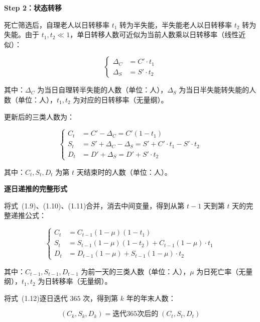 \documentclass[12pt,a4paper]{article}
\begin{document}
\noindent\textbf{Step 2：状态转移}

死亡筛选后，自理老人以日转移率 $t_1$ 转为半失能，半失能老人以日转移率 $t_2$ 转为失能。由于 $t_1, t_2 \ll 1$，单日转移人数可近似为当前人数乘以日转移率（线性近似）：

\begin{equation}
\left\{
\begin{aligned}
\Delta_C &= C' \cdot t_1 \\
\Delta_S &= S' \cdot t_2
\end{aligned}
\right.
\tag{1.10}
\end{equation}

其中：$\Delta_C$ 为当日自理转半失能的人数（单位：人），$\Delta_S$ 为当日半失能转失能的人数（单位：人），$t_1, t_2$ 为对应的日转移率（无量纲）。

更新后的三类人数为：

\begin{equation}
\left\{
\begin{aligned}
C_t &= C' - \Delta_C = C'(1 - t_1) \\
S_t &= S' + \Delta_C - \Delta_S = S' + C' \cdot t_1 - S' \cdot t_2 \\
D_t &= D' + \Delta_S = D' + S' \cdot t_2
\end{aligned}
\right.
\tag{1.11}
\end{equation}

其中：$C_t, S_t, D_t$ 为第 $t$ 天结束时的人数（单位：人）。

\noindent\textbf{逐日递推的完整形式}

将式~(1.9)、(1.10)、(1.11)合并，消去中间变量，得到从第 $t-1$ 天到第 $t$ 天的完整递推公式：

\begin{equation}
\boxed{
\left\{
\begin{aligned}
C_t &= C_{t-1} (1 - \mu) (1 - t_1) \\
S_t &= S_{t-1} (1 - \mu) (1 - t_2) + C_{t-1} (1 - \mu) \cdot t_1 \\
D_t &= D_{t-1} (1 - \mu) + S_{t-1} (1 - \mu) \cdot t_2
\end{aligned}
\right.
}
\tag{1.12}
\end{equation}

其中：$C_{t-1}, S_{t-1}, D_{t-1}$ 为前一天的三类人数（单位：人），$\mu$ 为日死亡率（无量纲），$t_1, t_2$ 为日转移率（无量纲）。

将式~(1.12)逐日迭代 $365$ 次，得到第 $k$ 年的年末人数：

\begin{equation}
(C_k, S_k, D_k) = \text{迭代365次后的} \; (C_t, S_t, D_t)
\tag{1.13}
\end{equation}
\end{document}
